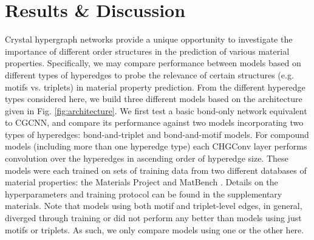 \documentclass[twoside,twocolumn,9pt]{article}
\begin{document}
\section{Results \& Discussion}
Crystal hypergraph networks provide a unique opportunity to investigate the importance of different order structures in the prediction of various material properties. Specifically, we may compare performance between models based on different types of hyperedges to probe the relevance of certain structures (e.g. motifs vs. triplets) in material property prediction. From the different hyperedge types considered here, we build three different models based on the architecture given in Fig. \ref{fig:architecture}.
We first test a basic bond-only network equivalent to CGCNN, and compare its performance against two models incorporating two types of hyperedges: bond-and-triplet and bond-and-motif models. 
For compound models (including more than one hyperedge type) each CHGConv layer performs convolution over the hyperedges in ascending order of hyperedge size. These models were each trained on sets of training data from two different databases of material properties: the Materials Project \cite{matproj} and MatBench \cite{matbench}. Details on the hyperparameters and training protocol can be found in the supplementary materials. Note that models using both motif and triplet-level edges, in general, diverged through training or did not perform any better than models using just motifs or triplets. As such, we only compare models using one or the other here.
\end{document}
